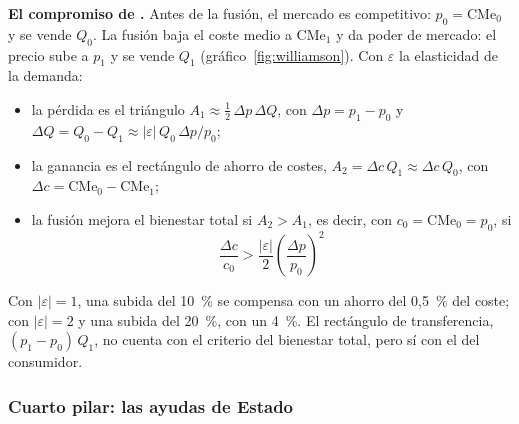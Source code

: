\documentclass[11pt]{article}
\begin{document}
\begin{anotaciones}
\textbf{El compromiso de .} Antes de la fusión, el mercado es competitivo: $p_0=\mathrm{CMe}_0$ y se vende $Q_0$. La fusión baja el coste medio a $\mathrm{CMe}_1$ y da poder de mercado: el precio sube a $p_1$ y se vende $Q_1$ (gráfico~\ref{fig:williamson}). Con $\varepsilon$ la elasticidad de la demanda:
\begin{itemize}
\item la pérdida es el triángulo $A_1\approx\tfrac12\,\Delta p\,\Delta Q$, con $\Delta p=p_1-p_0$ y $\Delta Q=Q_0-Q_1\approx|\varepsilon|\,Q_0\,\Delta p/p_0$;
\item la ganancia es el rectángulo de ahorro de costes, $A_2=\Delta c\,Q_1\approx\Delta c\,Q_0$, con $\Delta c=\mathrm{CMe}_0-\mathrm{CMe}_1$;
\item la fusión mejora el bienestar total si $A_2>A_1$, es decir, con $c_0=\mathrm{CMe}_0=p_0$, si
\begin{equation}\label{eq:williamson}
\frac{\Delta c}{c_0}>\frac{|\varepsilon|}{2}\left(\frac{\Delta p}{p_0}\right)^{2}
\end{equation}
\end{itemize}
Con $|\varepsilon|=1$, una subida del 10~\% se compensa con un ahorro del 0,5~\% del coste; con $|\varepsilon|=2$ y una subida del 20~\%, con un 4~\%. El rectángulo de transferencia, $(p_1-p_0)\,Q_1$, no cuenta con el criterio del bienestar total, pero sí con el del consumidor.
\begin{figuracaja}
\centering
\caption{El compromiso de Williamson: pérdida de eficiencia frente a ahorro de costes}\label{fig:williamson}
\end{figuracaja}
\end{anotaciones}

\subsubsection{Cuarto pilar: las ayudas de Estado}\label{sec:ayudas}
\end{document}
